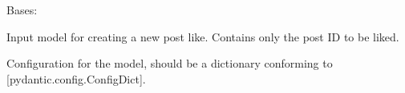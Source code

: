 \documentclass[letterpaper,10pt,openany,oneside,english]{sphinxmanual}
\begin{document}
\begin{savenotes}\begin{fulllineitems}

\pysigstartsignatures
{}
\pysigstopsignatures
\sphinxAtStartPar
Bases: 

\sphinxAtStartPar
Input model for creating a new post like.
Contains only the post ID to be liked.


\begin{savenotes}\begin{fulllineitems}

\pysigstartsignatures
{}
\pysigstopsignatures
\sphinxAtStartPar
Configuration for the model, should be a dictionary conforming to {[}\sphinxtitleref{ConfigDict}{]}{[}pydantic.config.ConfigDict{]}.

\end{fulllineitems}\end{savenotes}



\begin{savenotes}\begin{fulllineitems}

\pysigstartsignatures
{}
\pysigstopsignatures
\end{fulllineitems}\end{savenotes}


\end{fulllineitems}\end{savenotes}
\end{document}
